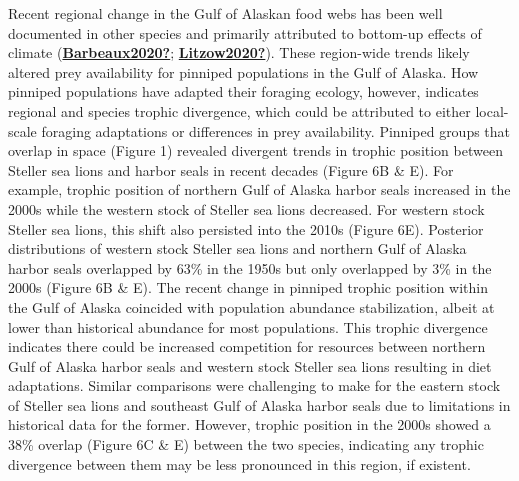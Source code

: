 \documentclass [11pt, proquest] {uwthesis}[2015/03/03]
\begin{document}
Recent regional change in the Gulf of Alaskan food webs has been well documented in other species and primarily attributed to bottom-up effects of climate (\protect\hyperlink{ref-Barbeaux2020}{\textbf{Barbeaux2020?}}; \protect\hyperlink{ref-Litzow2020}{\textbf{Litzow2020?}}). These region-wide trends likely altered prey availability for pinniped populations in the Gulf of Alaska. How pinniped populations have adapted their foraging ecology, however, indicates regional and species trophic divergence, which could be attributed to either local-scale foraging adaptations or differences in prey availability. Pinniped groups that overlap in space (Figure 1) revealed divergent trends in trophic position between Steller sea lions and harbor seals in recent decades (Figure 6B \& E). For example, trophic position of northern Gulf of Alaska harbor seals increased in the 2000s while the western stock of Steller sea lions decreased. For western stock Steller sea lions, this shift also persisted into the 2010s (Figure 6E). Posterior distributions of western stock Steller sea lions and northern Gulf of Alaska harbor seals overlapped by 63\% in the 1950s but only overlapped by 3\% in the 2000s (Figure 6B \& E). The recent change in pinniped trophic position within the Gulf of Alaska coincided with population abundance stabilization, albeit at lower than historical abundance for most populations. This trophic divergence indicates there could be increased competition for resources between northern Gulf of Alaska harbor seals and western stock Steller sea lions resulting in diet adaptations. Similar comparisons were challenging to make for the eastern stock of Steller sea lions and southeast Gulf of Alaska harbor seals due to limitations in historical data for the former. However, trophic position in the 2000s showed a 38\% overlap (Figure 6C \& E) between the two species, indicating any trophic divergence between them may be less pronounced in this region, if existent.
\end{document}
